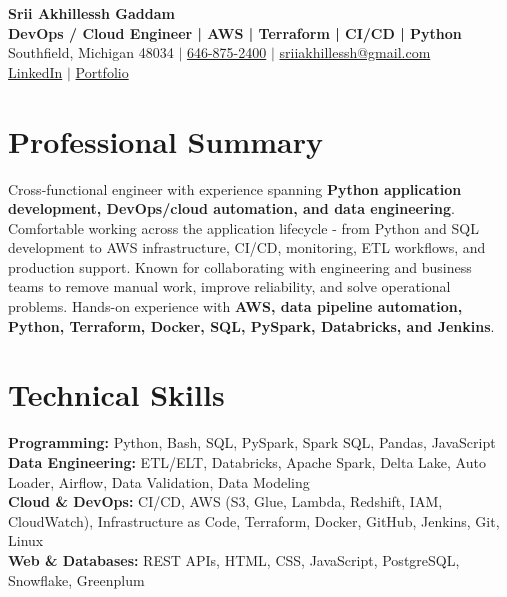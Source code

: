 \documentclass[letterpaper,10pt]{article}
\begin{document}
\fontsize{9.35pt}{10.45pt}\selectfont

\begin{center}
    {\LARGE \textbf{Srii Akhillessh Gaddam}} \\[-1pt]
    \textbf{DevOps / Cloud Engineer | AWS | Terraform | CI/CD | Python} \\[2pt]
    Southfield, Michigan 48034 $|$
    \href{tel:6468752400}{646-875-2400} $|$
    \href{mailto:sriiakhillessh@gmail.com}{sriiakhillessh@gmail.com} \\[1pt]
    \href{https://www.linkedin.com/in/srii-akhiilessh-gaddam-b48668191/}{LinkedIn} $|$
    \href{https://sriiakhillesshg.github.io/portfolio/}{Portfolio}
\end{center}
\vspace{-8pt}

\section{Professional Summary}
\small{Cross-functional engineer with experience spanning \textbf{Python application development, DevOps/cloud automation, and data engineering}. Comfortable working across the application lifecycle - from Python and SQL development to AWS infrastructure, CI/CD, monitoring, ETL workflows, and production support. Known for collaborating with engineering and business teams to remove manual work, improve reliability, and solve operational problems. Hands-on experience with \textbf{AWS, data pipeline automation, Python, Terraform, Docker, SQL, PySpark, Databricks, and Jenkins}.}

\section{Technical Skills}
\small{
\textbf{Programming:} Python, Bash, SQL, PySpark, Spark SQL, Pandas, JavaScript \\
\textbf{Data Engineering:} ETL/ELT, Databricks, Apache Spark, Delta Lake, Auto Loader, Airflow, Data Validation, Data Modeling \\
\textbf{Cloud \& DevOps:} CI/CD, AWS (S3, Glue, Lambda, Redshift, IAM, CloudWatch), Infrastructure as Code, Terraform, Docker, GitHub, Jenkins, Git, Linux \\
\textbf{Web \& Databases:} REST APIs, HTML, CSS, JavaScript, PostgreSQL, Snowflake, Greenplum
}
\end{document}
